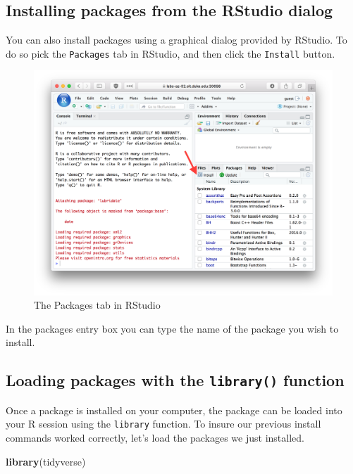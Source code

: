 \documentclass[]{book}
\newenvironment{Shaded}{\begin{snugshade}}{\end{snugshade}}
\newcommand{\KeywordTok}[1]{\textcolor[rgb]{0.13,0.29,0.53}{\textbf{#1}}}
\newcommand{\NormalTok}[1]{#1}
\theoremstyle{definition}
\theoremstyle{definition}
\theoremstyle{definition}
\theoremstyle{remark}
\begin{document}
\hypertarget{installing-packages-from-the-rstudio-dialog}{%
\subsection{Installing packages from the RStudio
dialog}\label{installing-packages-from-the-rstudio-dialog}}

You can also install packages using a graphical dialog provided by
RStudio. To do so pick the \texttt{Packages} tab in RStudio, and then
click the \texttt{Install} button.

\begin{figure}

{\centering \includegraphics[width=0.6\linewidth]{./figures/fig-rstudio-packages-tab} 

}

\caption{The Packages tab in RStudio}\label{fig:unnamed-chunk-58}
\end{figure}

In the packages entry box you can type the name of the package you wish
to install.

\hypertarget{loading-packages-with-the-library-function}{%
\subsection{\texorpdfstring{Loading packages with the \texttt{library()}
function}{Loading packages with the library() function}}\label{loading-packages-with-the-library-function}}

Once a package is installed on your computer, the package can be loaded
into your R session using the \texttt{library} function. To insure our
previous install commands worked correctly, let's load the packages we
just installed.

\begin{Shaded}
\begin{Highlighting}[]
\KeywordTok{library}\NormalTok{(tidyverse)}
\end{Highlighting}
\end{Shaded}
\end{document}
